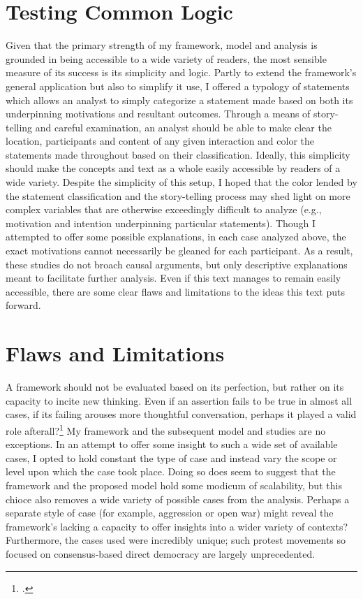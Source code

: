 \documentclass[openany,twoside]{memoir}
\begin{document}
\begin{Spacing}{2}
\section{Testing Common Logic}
Given that the primary strength of my framework, model and analysis is grounded in being accessible to a wide variety of readers, the most sensible measure of its success is its simplicity and logic.
Partly to extend the framework's general application but also to simplify it use, I offered a typology of statements which allows an analyst to simply categorize a statement made based on both its underpinning motivations and resultant outcomes.
Through a means of story-telling and careful examination, an analyst should be able to make clear the location, participants and content of any given interaction and color the statements made throughout based on their classification.
Ideally, this simplicity should make the concepts and text as a whole easily accessible by readers of a wide variety.
Despite the simplicity of this setup, I hoped that the color lended by the statement classification and the story-telling process may shed light on more complex variables that are otherwise exceedingly difficult to analyze (e.g., motivation and intention underpinning particular statements).
Though I attempted to offer some possible explanations, in each case analyzed above, the exact motivations cannot necessarily be gleaned for each participant.
As a result, these studies do not broach causal arguments, but only descriptive explanations meant to facilitate further analysis.
Even if this text manages to remain easily accessible, there are some clear flaws and limitations to the ideas this text puts forward.

\section{Flaws and Limitations}
A framework should not be evaluated based on its perfection, but rather on its capacity to incite new thinking.
Even if an assertion fails to be true in almost all cases, if its failing arouses more thoughtful conversation, perhaps it played a valid role afterall?\footcite[I do not at all mean to suggest that the theories outlined here are as seminal as Freud's were. But, with Freud's theories as an example, even wrong theories can be helpful. See][]{westen98}
My framework and the subsequent model and studies are no exceptions.
In an attempt to offer some insight to such a wide set of available cases, I opted to hold constant the type of case and instead vary the scope or level upon which the case took place.
Doing so does seem to suggest that the framework and the proposed model hold some modicum of scalability, but this chioce also removes a wide variety of possible cases from the analysis.
Perhaps a separate style of case (for example, aggression or open war) might reveal the framework's lacking a capacity to offer insights into a wider variety of contexts?
Furthermore, the cases used were incredibly unique; such protest movements so focused on consensus-based direct democracy are largely unprecedented.


\end{Spacing}
\end{document}
